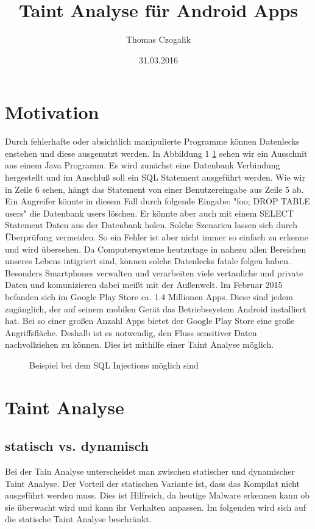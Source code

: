 \documentclass[runningheads]{llncs}
\begin{document}
\mainmatter
\title{Taint Analyse für Android Apps}
\author{Thomas Czogalik}
\date{31.03.2016}
\maketitle

\section{Motivation}
Durch fehlerhafte oder absichtlich manipulierte Programme können Datenlecks enstehen und diese ausgenutzt werden. 
In Abbildung 1 \ref{fig:sql_code} sehen wir ein Ausschnit aus einem Java Programm. Es wird zunächst eine Datenbank Verbindung hergestellt und im Anschluß soll ein SQL Statement ausgeführt werden. Wie wir in Zeile 6 sehen, hängt das Statement von einer Benutzereingabe aus Zeile 5 ab. Ein Angreifer könnte in diesem Fall durch folgende Eingabe: "foo; DROP TABLE users" die Datenbank users löschen. Er könnte aber auch mit einem SELECT Statement Daten aus der Datenbank holen. Solche Szenarien lassen sich durch Überprüfung vermeiden. So ein Fehler ist aber nicht immer so einfach zu erkenne und wird übersehen. Da Computersysteme heutzutage in nahezu allen Bereichen unseres Lebens intigriert sind, können solche Datenlecks fatale folgen haben. Besonders Smartphones verwalten und verarbeiten viele vertauliche und private Daten und komunizieren dabei meißt mit der Außenwelt. Im Februar 2015 befanden sich im Google Play Store ca. 1.4 Millionen Apps. Diese sind jedem zugänglich, der auf seinem mobilen Gerät das Betriebssystem Android installiert hat. Bei so einer großen Anzahl Apps bietet der Google Play Store eine große Angriffsfläche. Deshalb ist es notwendig, den Fluss sensitiver Daten nachvollziehen zu können. Dies ist mithilfe einer Taint Analyse möglich.

\begin{figure}

\caption{Beispiel bei dem SQL Injections möglich sind}
\label{fig:sql_code}
\end{figure}

\section{Taint Analyse}
\subsection{statisch vs. dynamisch}
Bei der Tain Analyse unterscheidet man zwischen statischer und dynamischer Taint Analyse. Der Vorteil der statischen Variante ist, dass das Kompilat nicht ausgeführt werden muss. Dies ist Hilfreich, da heutige Malware erkennen kann ob sie überwacht wird und kann ihr Verhalten anpassen. Im folgenden wird sich auf die statische Taint Analyse beschränkt.
\end{document}
